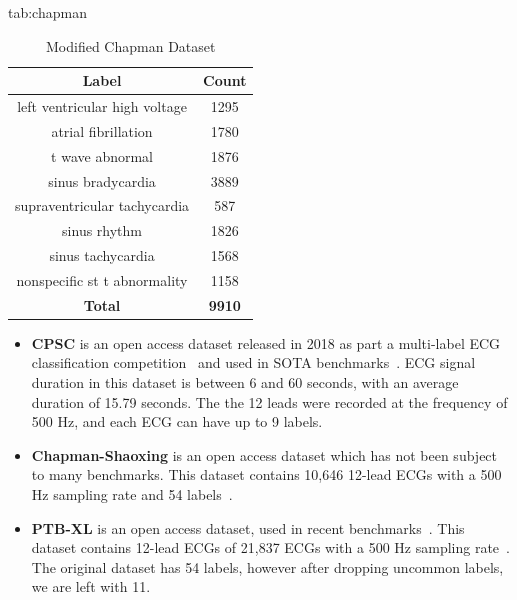 \documentclass[pmlr,twocolumn]{jmlr}%
\begin{document}
\begin{table}[tbp]
\floatconts
  {tab:chapman}%
  {\caption{Modified Chapman Dataset}}%
  {
    \begin{tabular}{|c|c|}
     \hline
    Label & Count \\
     \hline
    left ventricular high voltage &  1295 \\
    atrial fibrillation           &  1780 \\
    t wave abnormal               &  1876 \\
    sinus bradycardia             &  3889 \\
    supraventricular tachycardia  &   587 \\
    sinus rhythm                  &  1826 \\
    sinus tachycardia             &  1568 \\
    nonspecific st t abnormality  &  1158 \\
     \hline
    \textbf{Total} & \textbf{9910}\\
    \hline
    \end{tabular}
  }
\end{table}

\begin{itemize}
    \item \textbf{CPSC} is an open access  dataset released in 2018 as part a multi-label ECG classification competition~\cite{liu2018open} and used in SOTA benchmarks~\cite{strodthoff2020deep}. ECG signal duration in this dataset is between 6 and 60 seconds, with an average duration of 15.79 seconds. The the 12 leads were recorded at the frequency of 500 Hz, and each ECG can have up to 9 labels.
    \item \textbf{Chapman-Shaoxing} is an open access dataset which has not been subject to many benchmarks. This dataset contains 10,646 12-lead ECGs with a 500 Hz sampling rate and 54 labels~\cite{zheng202012}.
    \item \textbf{PTB-XL} is an open access dataset, used in recent benchmarks~\cite{strodthoff2020deep}. This dataset contains 12-lead ECGs of 21,837 ECGs with a 500 Hz sampling rate~\cite{zheng202012}. The original dataset has 54 labels, however after dropping uncommon labels, we are left with 11. 
\end{itemize}
\end{document}
